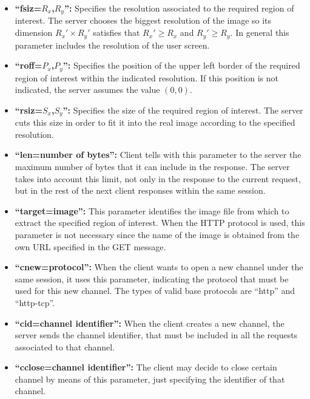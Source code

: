 \begin{itemize}

\item \textbf{``fsiz=$R_{x}$,$R_{y}$'':} Specifies the resolution
associated to the required region of interest. The server chooses
the biggest resolution of the image so its dimension $R_{x}' \times R_{y}'$
satisfies that $R_{x}' \geq R_{x}$ and $R_{y}' \geq R_{y}$. In general
this parameter includes the resolution of the user screen.

\item \textbf{``roff=$P_{x}$,$P_{y}$'':} Specifies the position of the
upper left border of the required region of interest within the
indicated resolution. If this position is not indicated, the
server assumes the value $(0,0)$.

\item \textbf{``rsiz=$S_{x}$,$S_{y}$'':} Specifies the size
of the required region of interest. The server cuts this size
in order to fit it into the real image according to the
specified resolution.

\item \textbf{``len=number of bytes'':} Client tells with
this parameter to the server the maximum number of bytes
that it can include in the response. The server takes into
account this limit, not only in the response to the
current request, but in the rest of the next client responses
within the same session.

\item \textbf{``target=image'':} This parameter identifies the image
file from which to extract the specified region of interest.
When the HTTP protocol is used, this parameter is not necessary
since the name of the image is obtained from the own URL
specified in the GET message.

\item \textbf{``cnew=protocol'':} When the client wants to open
a new channel under the same session, it uses this parameter,
indicating the protocol that must be used for this new channel. The
types of valid base protocols are ``http'' and ``http-tcp''.

\item \textbf{``cid=channel identifier'':} When the client creates
a new channel, the server sends the channel identifier, that must
be included in all the requests associated to that channel.

\item \textbf{``cclose=channel identifier'':} The client may decide
to close certain channel by means of this parameter, just specifying
the identifier of that channel.


\end{itemize}
